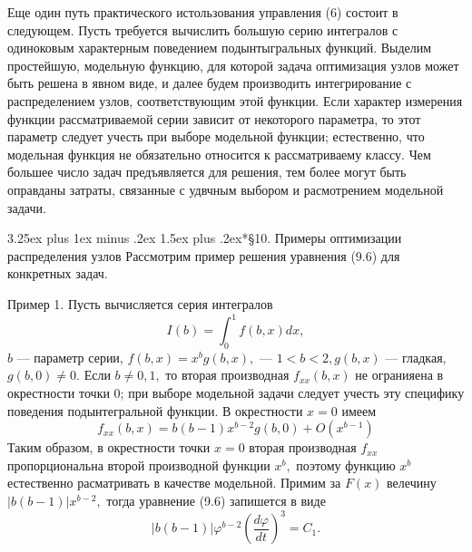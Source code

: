 \documentclass[twoside]{article}
\makeatletter
\renewcommand{\subsection}{\@startsection{subsection}{2}%
{\parindent}{3.25ex plus 1ex minus .2ex}%
{1.5ex plus .2ex}{\bfseries}}
\makeatother
\begin{document}
Еще один путь практического истользования управления (6) состоит в следующем.
Пусть требуется вычислить большую серию интегралов с одиноковым характерным 
поведением подынтыгральных функций. Выделим простейшую, модельную функцию, для которой задача
оптимизация узлов может быть решена в явном виде, и далее будем производить
интегрирование с распределением узлов, соответствующим этой функции. 
Если характер измерения функции рассматриваемой серии зависит от некоторого 
параметра, то этот параметр следует учесть при выборе модельной функции; естественно, 
что модельная функция не обязательно относится к рассматриваему классу. Чем большее 
число задач предъявляется для решения, тем более могут быть оправданы затраты, 
связанные с удвчным выбором и расмотрением модельной задачи.

\subsection*{\S 10. Примеры оптимизации распределения узлов}
Рассмотрим пример решения уравнения (9.6) для конкретных задач.

П\hspace{3pt}р\hspace{3pt}и\hspace{3pt}м\hspace{3pt}е\hspace{3pt}р 1. Пусть вычисляется серия интегралов
$$
I\left( b\right) =\int ^{1}_{0}f\left( b,x\right) dx,
$$
$b$ --- параметр серии, $f\left( b,x\right) =x^{b}g\left( b,x\right) ,$ --- $1 <b <2, g\left( b,x\right)$ ---
гладкая, $g\left( b,0\right) \neq 0.$ Если $b\neq 0,1,$ то вторая производная  $f_{xx}\left( b,x\right)$ не огранияена в окрестности точки 0; при выборе модельной
задачи следует учесть эту специфику поведения подынтегральной функции. В окрестности $x=0$ имеем
$$
f_{xx}\left( b,x\right) =b\left( b-1\right) x^{b-2}g\left( b,0\right) +O\left( x^{b-1}\right)
$$
Таким образом, в окрестности точки $x=0$ вторая производная $f_{xx}$ пропорциональна второй производной функции $x^b,$
поэтому функцию $x^b$ естественно расматривать в качестве модельной. Примим за $F(x)$ велечину 
$\left| b\left( b-1\right) \right| x^{b-2},$ тогда уравнение (9.6) запишется в виде
$$
\left| b\left( b-1\right) \right| \varphi ^{b-2}\left( \dfrac {d\varphi }{dt}\right) ^{3}=C_{1}.
$$
\end{document}
